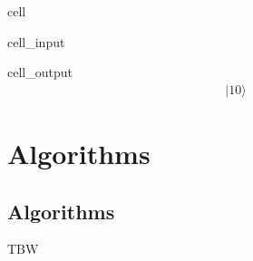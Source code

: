 \documentclass[letterpaper,10pt,english]{jupyterBook}
\begin{document}
\begin{sphinxuseclass}{cell}\begin{sphinxVerbatimInput}

\begin{sphinxuseclass}{cell_input}
\begin{sphinxVerbatim}[commandchars=\\\{\}]
\end{sphinxVerbatim}

\end{sphinxuseclass}\end{sphinxVerbatimInput}
\begin{sphinxVerbatimOutput}

\begin{sphinxuseclass}{cell_output}\begin{equation*}
\begin{split} |10\rangle\end{split}
\end{equation*}
\end{sphinxuseclass}\end{sphinxVerbatimOutput}

\end{sphinxuseclass}
\sphinxstepscope


\part{Algorithms}

\sphinxstepscope


\chapter{Algorithms}
\label{\detokenize{algorithms/intro:algorithms}}\label{\detokenize{algorithms/intro:chap-algorithms}}\label{\detokenize{algorithms/intro::doc}}
\sphinxAtStartPar
TBW

\sphinxstepscope
\end{document}

